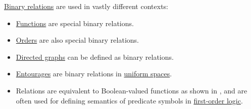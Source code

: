 \begin{example}\label{ex:def:binary_relation}
  \hyperref[def:binary_relation]{Binary relations} are used in vastly different contexts:
  \begin{itemize}
    \item \hyperref[def:function]{Functions} are special binary relations.
    \item \hyperref[ch:order_theory]{Orders} are also special binary relations.
    \item \hyperref[def:directed_graph]{Directed graphs} can be defined as binary relations.
    \item \hyperref[def:entourage]{Entourages} are binary relations in \hyperref[def:uniform_space]{uniform spaces}.
    \item Relations are equivalent to Boolean-valued functions as shown in , and are often used for defining semantics of predicate symbols in \hyperref[sec:first_order_logic]{first-order logic}.
  \end{itemize}
\end{example}

